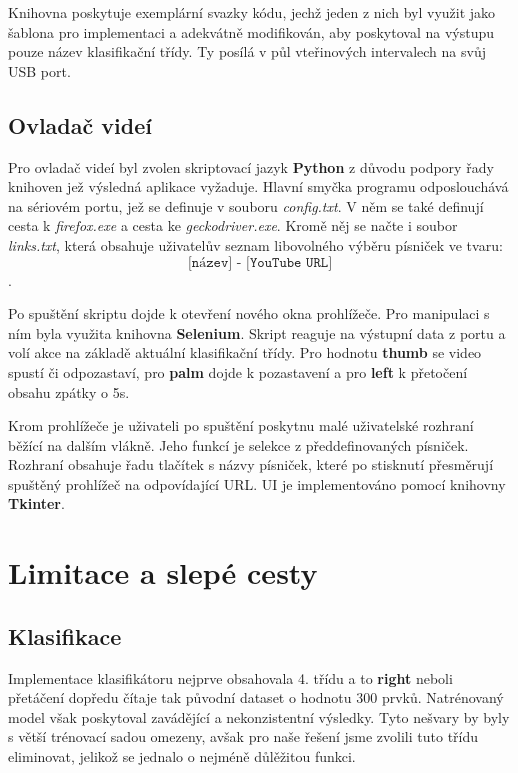 \documentclass[titlepage, a4paper, 11pt]{article}
\begin{document}
Knihovna poskytuje exemplární svazky kódu, jechž jeden z nich byl využit jako šablona pro implementaci a adekvátně modifikován, aby poskytoval na výstupu pouze název klasifikační třídy. Ty posílá v půl vteřinových intervalech na svůj USB port.

\subsection{Ovladač videí}

Pro ovladač videí byl zvolen skriptovací jazyk \textbf{Python} z důvodu podpory řady knihoven jež výsledná aplikace vyžaduje. Hlavní smyčka programu odposlouchává na sériovém portu, jež se definuje v souboru \textit{config.txt}. V něm se také definují cesta k \textit{firefox.exe} a cesta ke \textit{geckodriver.exe}. Kromě něj se načte i soubor \textit{links.txt}, která obsahuje uživatelův seznam libovolného výběru písniček ve tvaru:
$$\texttt{[název] - [YouTube URL]}$$.

Po spuštění skriptu dojde k otevření nového okna prohlížeče. Pro manipulaci s ním byla využita knihovna \textbf{Selenium}. Skript reaguje na výstupní data z portu a volí akce na základě aktuální klasifikační třídy. Pro hodnotu \textbf{thumb} se video spustí či odpozastaví, pro \textbf{palm} dojde k pozastavení a pro \textbf{left} k přetočení obsahu zpátky o 5s.

Krom prohlížeče je uživateli po spuštění poskytnu malé uživatelské rozhraní běžící na dalším vlákně. Jeho funkcí je selekce z předdefinovaných písniček. Rozhraní obsahuje řadu tlačítek s názvy písniček, které po stisknutí přesměrují spuštěný prohlížeč na odpovídající URL. UI je implementováno pomocí knihovny \textbf{Tkinter}.

\section{Limitace a slepé cesty}

\subsection{Klasifikace}

Implementace klasifikátoru nejprve obsahovala 4. třídu a to \textbf{right} neboli přetáčení dopředu čítaje tak původní dataset o hodnotu 300 prvků. Natrénovaný model však poskytoval zavádějící a nekonzistentní výsledky. Tyto nešvary by byly s větší trénovací sadou omezeny, avšak pro naše řešení jsme zvolili tuto třídu eliminovat, jelikož se jednalo o nejméně důlěžitou funkci.
\end{document}
